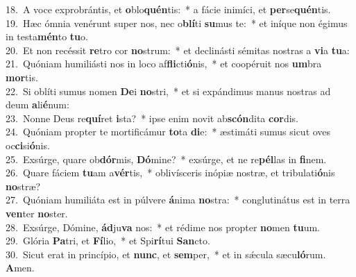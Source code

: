 {18.~}A voce exprobrántis, et \textbf{o}blo\textbf{quén}tis:~* a fácie inimíci, et \textbf{per}se\textbf{quén}tis.\\
{19.~}Hæc ómnia venérunt super nos, nec o\textbf{blí}ti \textbf{su}mus te:~* et iníque non égimus in testa\textbf{mén}to \textbf{tu}o.\\
{20.~}Et non recéssit \textbf{re}tro cor \textbf{no}strum:~* et declinásti sémitas nostras a \textbf{vi}a \textbf{tu}a:\\
{21.~}Quóniam humiliásti nos in loco af\textbf{fli}cti\textbf{ó}nis,~* et coopéruit nos \textbf{um}bra \textbf{mor}tis.\\
{22.~}Si oblíti sumus nomen \textbf{De}i \textbf{no}stri,~* et si expándimus manus nostras ad deum \textbf{a}li\textbf{é}num:\\
{23.~}Nonne Deus re\textbf{quí}ret \textbf{i}sta?~* ipse enim novit ab\textbf{scón}dita \textbf{cor}dis.\\
{24.~}Quóniam propter te mortificámur \textbf{to}ta \textbf{di}e:~* æstimáti sumus sicut oves oc\textbf{ci}si\textbf{ó}nis.\\
{25.~}Exsúrge, quare ob\textbf{dór}mis, \textbf{Dó}mine?~* exsúrge, et ne re\textbf{pél}las in \textbf{fi}nem.\\
{26.~}Quare fáciem \textbf{tu}am a\textbf{vér}tis,~* oblivísceris inópiæ nostræ, et tribulati\textbf{ó}nis \textbf{no}stræ?\\
{27.~}Quóniam humiliáta est in púlvere \textbf{á}nima \textbf{no}stra:~* conglutinátus est in terra \textbf{ven}ter \textbf{no}ster.\\
{28.~}Exsúrge, Dómine, \textbf{ád}ju\textbf{va} nos:~* et rédime nos propter \textbf{no}men \textbf{tu}um.\\
{29.~}Glória \textbf{Pa}tri, et \textbf{Fí}lio,~* et Spi\textbf{rí}tui \textbf{San}cto.\\
{30.~}Sicut erat in princípio, et \textbf{nunc}, et \textbf{sem}per,~* et in sǽcula sæcu\textbf{ló}rum. \textbf{A}men.\\
